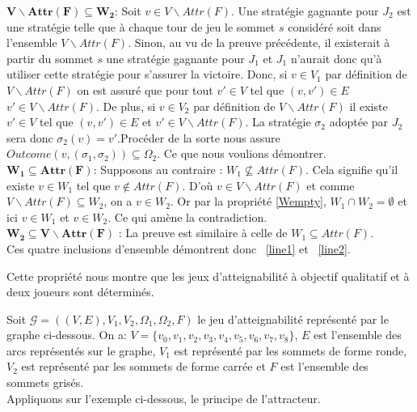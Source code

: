 \begin{demonstration}
		\noindent$\mathbf{V \backslash Attr(F) \subseteq W_{2}}$: Soit $v \in V \backslash Attr(F)$. Une stratégie gagnante pour $J_{2}$ est une stratégie telle que à chaque tour de jeu le sommet $s$ considéré soit dans l'ensemble $V\backslash Attr(F)$. Sinon, au vu de la preuve précédente, il existerait à partir du sommet $s$ une stratégie gagnante pour $J_{1}$ et $J_{1}$ n'aurait donc qu'à utiliser cette stratégie pour s'assurer la victoire. Donc, si $v \in V_{1}$ par définition de $V \backslash Attr(F)$ on est assuré que pour tout $v'\in V $ tel que $(v,v')\in E$ $v' \in V \backslash Attr(F)$. De plus, si $ v \in V_{2}$ par définition de $V \backslash Attr(F)$ il existe $v' \in V$ tel que $(v,v')\in E$ et $v' \in V \backslash Attr(F)$. La stratégie $\sigma _{2}$ adoptée par $J_{2}$ sera donc $\sigma _{2}(v)= v'$.Procéder de la sorte nous assure $Outcome(v,(\sigma _{1},\sigma _{2})) \subseteq \Omega _{2}$. Ce que nous voulions démontrer.\\
		
		\noindent $\mathbf{W_{1} \subseteq Attr(F)}$: Supposons au contraire : $W_{1} \not\subseteq Attr(F)$. Cela signifie qu'il existe $v \in W_{1}$ tel que $v \notin Attr(F)$. D'où $v \in V\backslash Attr(F)$ et comme $V \backslash Attr(F) \subseteq W_{2}$, on a $v \in W_{2}$. Or par la propriété \ref{Wempty}, $W_{1} \cap W_{2} = \emptyset $ et ici $v \in W_{1}$ et $v \in W_{2}$. Ce qui amène la contradiction.\\
		
		\noindent $\mathbf{W_{2} \subseteq V\backslash Attr(F)}$ : La preuve est similaire à celle de $W_{1} \subseteq Attr(F)$.\\
		
		Ces quatre inclusions d'ensemble démontrent donc ~\eqref{line1} et ~\eqref{line2}.
	\end{demonstration}
	\begin{rem}
		Cette propriété nous montre que les jeux d'atteignabilité à objectif qualitatif et à deux joueurs sont déterminés.
	\end{rem}
	

\begin{exemple}
Soit $\mathcal{G} = ((V,E),V_{1},V_{2},\Omega _{1}, \Omega _{2},F)$ le jeu d'atteignabilité représenté par le graphe ci-dessous. On a: $V = \{ v_{0},v_{1},v_{2},v_{3},v_{4},v_{5},v_{6},v_{7},v_{8} \}$, $E$ est l'ensemble des arcs représentés sur le graphe, $V_{1}$ est représenté par les sommets de forme ronde, $V_{2}$ est représenté par les sommets de forme carrée et $F$ est l'ensemble des sommets grisés.\\
Appliquons sur l'exemple ci-dessous, le principe de l'attracteur.


\FloatBarrier
\end{exemple}

